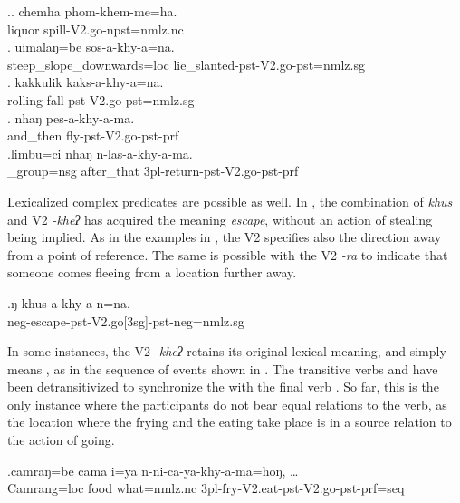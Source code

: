 	\ex.\ag. chemha phom-khem-me=ha.\\
	liquor spill{\sc [3sg]-V2.go-npst=nmlz.nc}\\
	\bg.  uimalaŋ=be sos-a-khy-a=na.\\
	 steep\_slope\_downwards{\sc =loc} lie\_slanted{\sc [3sg]-pst-V2.go-pst=nmlz.sg}\\
		\bg. kakkulik kaks-a-khy-a=na.\\
	rolling fall{\sc [3sg]-pst-V2.go-pst=nmlz.sg}\\
	\bg. nhaŋ    pes-a-khy-a-ma.\\
	and\_then fly{\sc [3sg]-pst-V2.go-pst-prf}\\
	  
\bg.limbu=ci            nhaŋ    n-las-a-khy-a-ma.\\
\_group{\sc =nsg} after\_that {\sc 3pl-}return{\sc -pst-V2.go-pst-prf}\\
 
	
\newpage
Lexicalized complex predicates are possible as well. In \Next, the combination of \emph{khus}  and V2 \emph{-kheʔ}  has acquired the meaning \emph{escape}, without an action of stealing being implied. As in the examples in \Last, the V2 specifies also the direction away from a point of reference. The same is possible with the V2 \emph{-ra}  to indicate that someone comes fleeing from a location further away.

\exg.ŋ-khus-a-khy-a-n=na.\\
{\sc neg-}escape{\sc -pst-V2.go[3sg]-pst-neg=nmlz.sg}\\

In some instances, the V2 \emph{-kheʔ} retains its original lexical meaning, and simply means , as in the sequence of events shown in \Next. The transitive verbs  and  have been detransitivized to synchronize the  with the final verb . So far, this is the only instance where the participants do not bear equal relations to the verb, as the location where the frying and the eating  take place is in a source relation to the action of going. 

\exg.camraŋ=be    cama i=ya           n-ni-ca-ya-khy-a-ma=hoŋ, {\dots}\\
Camrang{\sc =loc} food what{\sc =nmlz.nc} {\sc 3pl-}fry{\sc -V2.eat-pst-V2.go-pst-prf=seq}\\
 
